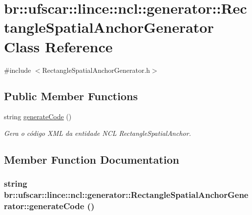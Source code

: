 \hypertarget{classbr_1_1ufscar_1_1lince_1_1ncl_1_1generator_1_1RectangleSpatialAnchorGenerator}{
\section{br::ufscar::lince::ncl::generator::RectangleSpatialAnchorGenerator Class Reference}
\label{classbr_1_1ufscar_1_1lince_1_1ncl_1_1generator_1_1RectangleSpatialAnchorGenerator}
}


{\ttfamily \#include $<$RectangleSpatialAnchorGenerator.h$>$}

\subsection*{Public Member Functions}
\begin{DoxyCompactItemize}
\item 
string \hyperlink{classbr_1_1ufscar_1_1lince_1_1ncl_1_1generator_1_1RectangleSpatialAnchorGenerator_acd0e776f5774588cf9c21fc3488c2db9}{generateCode} ()
\begin{DoxyCompactList}\small\item\em Gera o código XML da entidade NCL RectangleSpatialAnchor. \item\end{DoxyCompactList}\end{DoxyCompactItemize}


\subsection{Member Function Documentation}
\hypertarget{classbr_1_1ufscar_1_1lince_1_1ncl_1_1generator_1_1RectangleSpatialAnchorGenerator_acd0e776f5774588cf9c21fc3488c2db9}{
\subsubsection[{generateCode}]{\setlength{\rightskip}{0pt plus 5cm}string br::ufscar::lince::ncl::generator::RectangleSpatialAnchorGenerator::generateCode ()}}
\label{classbr_1_1ufscar_1_1lince_1_1ncl_1_1generator_1_1RectangleSpatialAnchorGenerator_acd0e776f5774588cf9c21fc3488c2db9}


